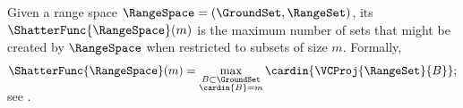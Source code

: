 \begin{defn}
        Given a range space $\RangeSpace = (\GroundSet, \RangeSet)$,
        its  $\ShatterFunc{\RangeSpace}(m)$ is
        the maximum number of sets that might be created by
        $\RangeSpace$ when restricted to subsets of size
        $m$. Formally,
        \begin{equation*}
            \ShatterFunc{\RangeSpace}(m)%
            =%
            \smash{\max_{\substack{B \subset \GroundSet\\
                     \cardin{B} = m}} \cardin{ \VCProj{\RangeSet}{B} }};
        \end{equation*}
        see .
    \end{defn}
